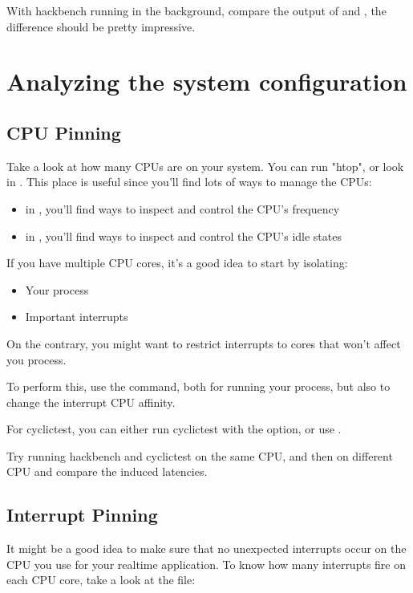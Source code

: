 
With hackbench running in the background, compare the output of  and , the
difference should be pretty impressive.

\section{Analyzing the system configuration}

\subsection{CPU Pinning}

Take a look at how many CPUs are on your system. You can run "htop", or
look in . This place is useful since you'll find
lots of ways to manage the CPUs:

\begin{itemize}
	\item in , you'll find ways to inspect and control the CPU's frequency
	\item in , you'll find ways to inspect and control the CPU's idle states
\end{itemize}

If you have multiple CPU cores, it's a good idea to start by isolating:
\begin{itemize}
	\item Your process
	\item Important interrupts
\end{itemize}

On the contrary, you might want to restrict interrupts to cores that won't affect
you process.

To perform this, use the  command, both for running your process, but
also to change the interrupt CPU affinity.

For cyclictest, you can either run cyclictest with the  option,
or use .

Try running hackbench and cyclictest on the same CPU, and then on different CPU and
compare the induced latencies.

\subsection{Interrupt Pinning}

It might be a good idea to make sure that no unexpected interrupts occur on the CPU
you use for your realtime application. To know how many interrupts fire on each CPU
core, take a look at the  file:

